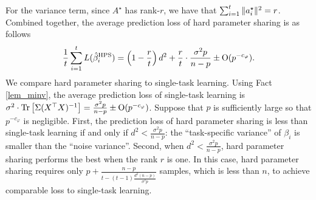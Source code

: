 \begin{example}
For the variance term, since $A^{\star}$ has rank-$r$, we have that $\sum_{i=1}^t \|a_i^{\star}\|^2 = r$.
Combined together, the average prediction loss of hard parameter sharing is as follows
\[ \frac{1}{t}\sum_{i=1}^t L(\hat{\beta}_i^{\textup{HPS}}) = \left({1 - \frac{r}{t}}\right) d^2 + \frac{r}{t} \cdot \frac{\sigma^2 p}{n - p} \pm \operatorname{O}(p^{-c_{\varphi}}). \]
We compare hard parameter sharing to single-task learning.
Using Fact \ref{lem_minv}, the average prediction loss of single-task learning is $\sigma^2\cdot \operatorname{Tr}\left[\Sigma (X^{\top} X)^{-1}\right] = \frac{\sigma^2 p}{n - p} \pm \operatorname{O}(p^{-{c_{\varphi}}})$.
	Suppose that $p$ is sufficiently large so that $p^{-c_{\varphi}}$ is negligible.
First, the prediction loss of hard parameter sharing is less than single-task learning if and only if $d^2 < \frac{\sigma^2 p}{n - p}$: the ``task-specific variance'' of $\beta_i$ is smaller than the ``noise variance''.
Second, when $d^2 < \frac{\sigma^2 p}{n - p}$, hard parameter sharing performs the best when the rank $r$ is one.
	In this case, hard parameter sharing requires only $p + \frac{n - p}{t - (t - 1)\frac{d^2 (n - p)}{\sigma^2 p}}$ samples, which is less than $n$, to achieve comparable loss to single-task learning.

\end{example}


